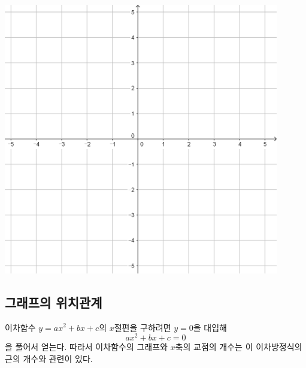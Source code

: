 \documentclass{oblivoir}
\begin{document}
\begin{minipage}{0.49\textwidth}\centering
\par\bigskip\includegraphics[width=0.9\textwidth]{55}
\end{minipage}\bigskip\bigskip\par

\subsection{그래프의 위치관계}
이차함수 \(y=ax^2+bx+c\)의 \(x\)절편을 구하려면 \(y=0\)을 대입해
\[ax^2+bx+c=0\]
을 풀어서 얻는다.
따라서 이차함수의 그래프와 \(x\)축의 교점의 개수는 이 이차방정식의 근의 개수와 관련이 있다.
\end{document}
